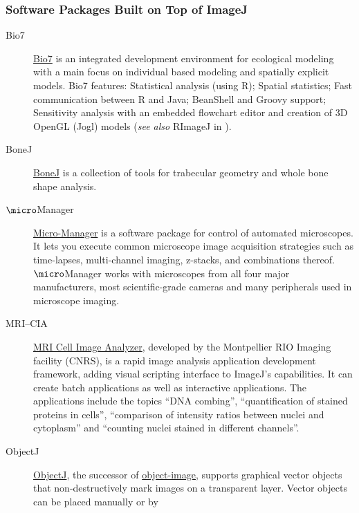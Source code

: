 \subsubsection{Software Packages Built on Top of ImageJ\label{sub:Other-Software-Packages}}
\begin{description}
\item [{Bio7}] \href{http://bio7.org/}{Bio7} is an integrated development
environment for ecological modeling with a main focus
on individual based modeling and spatially explicit models. Bio7 features:
Statistical analysis (using R); Spatial statistics; Fast communication
between R and
Java; BeanShell and Groovy support; Sensitivity analysis with an embedded
flowchart editor and creation of 3D OpenGL (Jogl) models (\emph{see
also} RImageJ in ).
\item [{BoneJ}] \href{http://bonej.org/}{BoneJ} is a collection
of tools for trabecular geometry and whole bone shape analysis.
\item [{$\micro$Manager}] \href{http://www.micro-manager.org/}{Micro-Manager}
is a software package for control of automated microscopes. It lets
you execute common microscope image acquisition strategies such as
time-lapses, multi-channel imaging, z-stacks, and combinations thereof.
$\micro$Manager works with microscopes
from all four major manufacturers, most scientific-grade cameras and
many peripherals used in microscope imaging.
\item [{MRI--CIA}] \href{http://www.mri.cnrs.fr/index.php?m=38}{MRI Cell Image Analyzer},
developed by the Montpellier RIO Imaging facility (CNRS), is a rapid
image analysis application development framework, adding visual scripting
interface to ImageJ's capabilities. It can create batch applications
as well as interactive applications. The applications include the
topics \textquotedblleft{}DNA combing\textquotedblright{}, \textquotedblleft{}quantification
of stained proteins in cells\textquotedblright{}, \textquotedblleft{}comparison
of intensity ratios between nuclei and cytoplasm\textquotedblright{}
and \textquotedblleft{}counting nuclei stained in different channels''.
\item [{ObjectJ}] \href{http://simon.bio.uva.nl/objectj/index.html}{ObjectJ},
the successor of \href{http://simon.bio.uva.nl/Object-Image/object-image.html}{object-image},
supports graphical vector objects that non-destructively mark images
on a transparent layer. Vector objects can be placed manually or by

\end{description}
